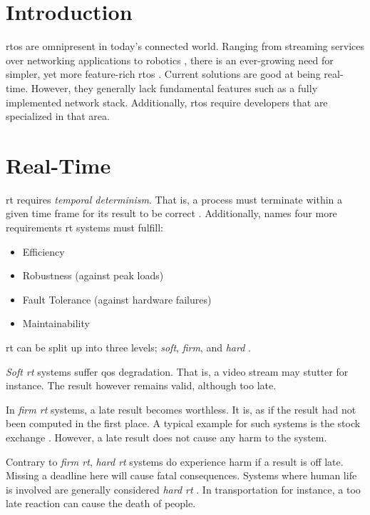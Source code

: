 \documentclass[10pt,twocolumn,a4paper]{article}
\begin{document}
\section{Introduction}\label{sec:introduction}

\acrfull{rtos} are omnipresent in today's connected world.
Ranging from streaming services over networking applications to robotics \cite{buttazzo_hard_1997}, there is an ever-growing need for simpler, yet more feature-rich \acrshort{rtos} \cite{reghenzani_realtime_2019}.
Current solutions are good at being real-time.
However, they generally lack fundamental features such as a fully implemented network stack.
Additionally, \acrshort{rtos} require developers that are specialized in that area.

\section{Real-Time}
\acrfull{rt} requires \emph{temporal determinism}.
That is, a process must terminate within a given time frame for its result to be correct \cite{reghenzani_realtime_2019}.
Additionally, \cite{buttazzo_hard_1997} names four more requirements \acrshort{rt} systems must fulfill:

\begin{itemize}
  \item Efficiency
  \item Robustness (against peak loads)
  \item Fault Tolerance (against hardware failures)
  \item Maintainability
\end{itemize}

\acrshort{rt} can be split up into three levels; \emph{soft}, \emph{firm}, and \emph{hard} \cite{buttazzo_hard_1997}.

\emph{Soft \acrshort{rt}} systems suffer \acrfull{qos} degradation.
That is, a video stream may stutter for instance.
The result however remains valid, although too late.

In \emph{firm \acrshort{rt}} systems, a late result becomes worthless.
It is, as if the result had not been computed in the first place.
A typical example for such systems is the stock exchange \cite{reghenzani_realtime_2019}.
However, a late result does not cause any harm to the system.

Contrary to \emph{firm \acrshort{rt}}, \emph{hard \acrshort{rt}} systems do experience harm if a result is off late.
Missing a deadline here will cause fatal consequences.
Systems where human life is involved are generally considered \emph{hard \acrshort{rt}} \cite{reghenzani_realtime_2019}.
In transportation for instance, a too late reaction can cause the death of people.
\end{document}
